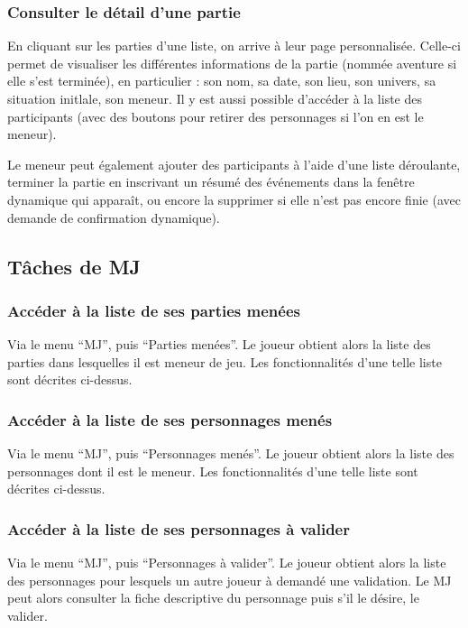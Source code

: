 \documentclass[a4paper, 11pt, titlepage]{article}
\begin{document}
\subsubsection {Consulter le détail d'une partie}

En cliquant sur les parties d'une liste, on arrive à leur page personnalisée. Celle-ci permet de visualiser les différentes informations de la partie (nommée aventure si elle s'est terminée), en particulier : son nom, sa date, son lieu, son univers, sa situation initlale, son meneur. Il y est aussi possible d'accéder à la liste des participants (avec des boutons pour retirer des personnages si l'on en est le meneur).

Le meneur peut également ajouter des participants à l'aide d'une liste déroulante, terminer la partie en inscrivant un résumé des événements dans la fenêtre dynamique qui apparaît, ou encore la supprimer si elle n'est pas encore finie (avec demande de confirmation dynamique).


\subsection {Tâches de MJ}

\subsubsection {Accéder à la liste de ses parties menées}

Via le menu “MJ”, puis “Parties menées”. Le joueur obtient alors la liste des parties dans lesquelles il est meneur de jeu. Les fonctionnalités d’une telle liste sont décrites ci-dessus.

\subsubsection {Accéder à la liste de ses personnages menés}

Via le menu “MJ”, puis “Personnages menés”. Le joueur obtient alors la liste des personnages dont il est le meneur. Les fonctionnalités d’une telle liste sont décrites ci-dessus.

\subsubsection {Accéder à la liste de ses personnages à valider}

Via le menu “MJ”, puis “Personnages à valider”. Le joueur obtient alors la liste des personnages pour lesquels un autre joueur à demandé une validation. Le MJ peut alors consulter la fiche descriptive du personnage puis s’il le désire, le valider.
\end{document}
